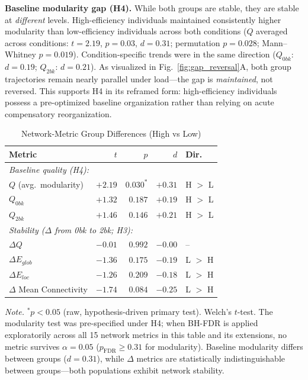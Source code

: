 \documentclass[conference]{IEEEtran}
\begin{document}
\textbf{Baseline modularity gap (H4).} While both groups are stable, they are stable at \emph{different} levels. High-efficiency individuals maintained consistently higher modularity than low-efficiency individuals across both conditions ($Q$ averaged across conditions: $t=2.19$, $p=0.03$, $d=0.31$; permutation $p=0.028$; Mann--Whitney $p=0.019$). Condition-specific trends were in the same direction ($Q_{0bk}$: $d=0.19$; $Q_{2bk}$: $d=0.21$). As visualized in Fig.~\ref{fig:gap_reversal}A, both group trajectories remain nearly parallel under load---the gap is \emph{maintained}, not reversed. This supports H4 in its reframed form: high-efficiency individuals possess a pre-optimized baseline organization rather than relying on acute compensatory reorganization.

\begin{table}[t]
\caption{Network-Metric Group Differences (High vs Low)}
\label{tab:network}
\centering
\footnotesize
\setlength{\tabcolsep}{4pt}
\begin{tabular}{@{}l r r r l@{}}
\toprule
\textbf{Metric}  & \textbf{$t$} & \textbf{$p$} & \textbf{$d$} & \textbf{Dir.} \\
\midrule
\multicolumn{5}{l}{\textit{Baseline quality (H4):}} \\
$Q$ (avg.\ modularity)            & $+2.19$ & $0.030^{*}$ & $+0.31$ & H $>$ L \\
$Q_{0bk}$                         & $+1.32$ & $0.187$     & $+0.19$ & H $>$ L \\
$Q_{2bk}$                         & $+1.46$ & $0.146$     & $+0.21$ & H $>$ L \\
\midrule
\multicolumn{5}{l}{\textit{Stability ($\Delta$ from 0bk to 2bk; H3):}} \\
$\Delta Q$                         & $-0.01$ & $0.992$     & $-0.00$ & -- \\
$\Delta E_{glob}$                  & $-1.36$ & $0.175$     & $-0.19$ & L $>$ H \\
$\Delta E_{loc}$                   & $-1.26$ & $0.209$     & $-0.18$ & L $>$ H \\
$\Delta$ Mean Connectivity         & $-1.74$ & $0.084$     & $-0.25$ & L $>$ H \\
\bottomrule
\end{tabular}
\vspace{0.2em}

\scriptsize \textit{Note.} $^{*}p<0.05$ (raw, hypothesis-driven primary test). Welch's $t$-test. The modularity test was pre-specified under H4; when BH-FDR is applied exploratorily across all 15 network metrics in this table and its extensions, no metric survives $\alpha=0.05$ ($p_{\mathrm{FDR}}\geq 0.31$ for modularity). Baseline modularity differs between groups ($d=0.31$), while $\Delta$ metrics are statistically indistinguishable between groups---both populations exhibit network stability.
\end{table}
\end{document}
